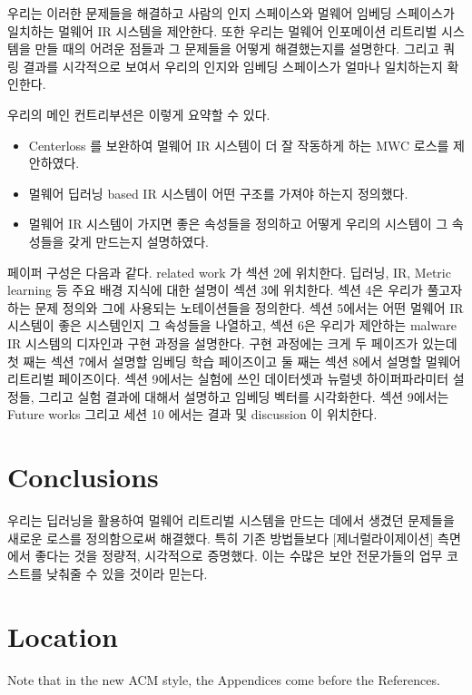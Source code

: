 우리는 이러한 문제들을 해결하고 사람의 인지 스페이스와 멀웨어 임베딩 스페이스가 일치하는 멀웨어 IR 시스템을 제안한다. 또한 우리는 멀웨어 인포메이션 리트리벌 시스템을 만들 때의 어려운 점들과 그 문제들을 어떻게 해결했는지를 설명한다. 그리고 쿼링 결과를 시각적으로 보여서 우리의 인지와 임베딩 스페이스가 얼마나 일치하는지 확인한다. %

우리의 메인 컨트리부션은 이렇게 요약할 수 있다.

\begin{itemize}
\item Centerloss 를 보완하여 멀웨어 IR 시스템이 더 잘 작동하게 하는 MWC 로스를 제안하였다.
\item 멀웨어 딥러닝 based IR 시스템이 어떤 구조를 가져야 하는지 정의했다.
\item 멀웨어 IR 시스템이 가지면 좋은 속성들을 정의하고 어떻게 우리의 시스템이 그 속성들을 갖게 만드는지 설명하였다.
\end{itemize}

페이퍼 구성은 다음과 같다. related work 가 섹션 2에 위치한다. 딥러닝, IR, Metric learning 등 주요 배경 지식에 대한 설명이 섹션 3에 위치한다. 섹션 4은 우리가 풀고자하는 문제 정의와 그에 사용되는 노테이션들을 정의한다. 섹션 5에서는 어떤 멀웨어 IR 시스템이 좋은 시스템인지 그 속성들을 나열하고, 섹션 6은 우리가 제안하는 malware IR 시스템의 디자인과 구현 과정을 설명한다. 구현 과정에는 크게 두 페이즈가 있는데 첫 째는 섹션 7에서 설명할 임베딩 학습 페이즈이고 둘 째는 섹션 8에서 설명할 멀웨어 리트리벌 페이즈이다. 섹션 9에서는 실험에 쓰인 데이터셋과 뉴럴넷 하이퍼파라미터 설정들, 그리고 실험 결과에 대해서 설명하고 임베딩 벡터를 시각화한다. 섹션 9에서는 Future works 그리고 세션 10 에서는 결과 및 discussion 이 위치한다. 













\section{Conclusions}

우리는 딥러닝을 활용하여 멀웨어 리트리벌 시스템을 만드는 데에서 생겼던 문제들을 새로운 로스를 정의함으로써 해결했다. 특히 기존 방법들보다 [제너럴라이제이션] 측면에서 좋다는 것을 정량적, 시각적으로 증명했다. 이는 수많은 보안 전문가들의 업무 코스트를 낮춰줄 수 있을 것이라 믿는다.

\appendix

\section{Location}

Note that in the new ACM style, the Appendices come before the References.


\begin{acks}
\end{acks}
